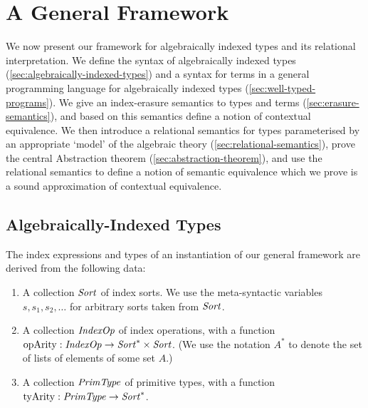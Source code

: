 \newcommand{\Gen}{\mathrm{Gen}}
\newcommand{\Free}{\mathrm{Free}}
\newcommand{\semSort}[2]{\llbracket #1 \rrbracket^{\mathcal{#2}}}
\newcommand{\semIndexExp}[2]{\llbracket #1 \rrbracket^{\mathcal{#2}}}
\newcommand{\semPrim}[3]{\llbracket #1 \rrbacket^{\mathcal{#2}}_{\mathcal{#3}}}
\newcommand{\opsCtxt}{\Gamma_{\mathit{ops}}}
\newcommand{\opsEnv}{\eta_{\mathit{ops}}}
\section{A General Framework}
\label{sec:a-general-framework}

We now present our framework for algebraically indexed types and its
relational interpretation.  We define the syntax of algebraically
indexed types (\autoref{sec:algebraically-indexed-types}) and a syntax
for terms in a general programming language for algebraically indexed
types (\autoref{sec:well-typed-programs}). We give an index-erasure
semantics to types and terms (\autoref{sec:erasure-semantics}), and
based on this semantics define a notion of contextual equivalence. We
then introduce a relational semantics for types parameterised by an appropriate
`model' of the algebraic theory (\autoref{sec:relational-semantics}),
prove the central Abstraction theorem
(\autoref{sec:abstraction-theorem}), and use the relational semantics
to define a notion of semantic equivalence which we prove is a sound
approximation of contextual equivalence.


\subsection{Algebraically-Indexed Types}
\label{sec:algebraically-indexed-types}

The index expressions and types of an instantiation of our general
framework are derived from the following data:
\begin{enumerate}
\item A collection $\mathit{Sort}$ of index sorts. We use the
  meta-syntactic variables $s,s_1,s_2,\ldots$ for arbitrary sorts taken
  from $\mathit{Sort}$.
\item A collection $\mathit{IndexOp}$ of index operations, with a function
  $\mathrm{opArity} : \mathit{IndexOp} \to \mathit{Sort}^* \times \mathit{Sort}$. (We use
  the notation $A^*$ to denote the set of lists of elements of some
  set $A$.)
\item A collection $\mathit{PrimType}$ of primitive types, with a function
  $\mathrm{tyArity} : \mathit{PrimType} \to \mathit{Sort}^*$. %
\end{enumerate}

